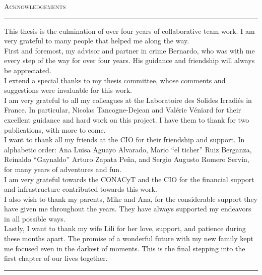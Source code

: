\null
\vfill

\begin{center}

{\LARGE{\scshape Acknowledgements}}\\

\noindent\rule[2pt]{0.85\textwidth}{0.5pt}

\parbox{0.85\textwidth}{
This thesis is the culmination of over four years of collaborative team work. I
am very grateful to many people that helped me along the way.\\

First and foremost, my advisor and partner in crime Bernardo, who was with me
every step of the way for over four years. His guidance and friendship will
always be appreciated.\\

I extend a special thanks to my thesis committee, whose comments and suggestions
were invaluable for this work.\\

I am very grateful to all my colleagues at the Laboratoire des Solides
Irradi\'es in France. In particular, Nicolas Tancogne-Dejean and Val\'erie
V\'eniard for their excellent guidance and hard work on this project. I have
them to thank for two publications, with more to come.\\

I want to thank all my friends at the CIO for their friendship and support. In
alphabetic order: Ana Luisa Aguayo Alvarado, Mario ``el ticher'' Ruiz Berganza,
Reinaldo ``Gaynaldo'' Arturo Zapata Pe\~na, and Sergio Augusto Romero Serv\'in,
for many years of adventures and fun.\\

I am very grateful towards the CONACyT and the CIO for the financial support and
infrastructure contributed towards this work.\\

I also wish to thank my parents, Mike and Ana, for the considerable support they
have given me throughout the years. They have always supported my endeavors in
all possible ways.\\

Lastly, I want to thank my wife Lili for her love, support, and patience during
these months apart. The promise of a wonderful future with my new family kept me
focused even in the darkest of moments. This is the final stepping into the
first chapter of our lives together.}

\noindent\rule[2pt]{0.85\textwidth}{0.5pt}

\end{center}

\vfill

\cleardoublepage
